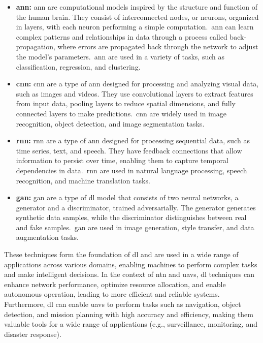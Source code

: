 \begin{itemize}
  \item \textbf{\gls{ann}:} \gls{ann} are computational models inspired by the structure and function of the human brain. They consist of interconnected nodes, or neurons, organized in layers, with each neuron performing a simple computation.\ \gls{ann} can learn complex patterns and relationships in data through a process called back-propagation, where errors are propagated back through the network to adjust the model's parameters.\ \gls{ann} are used in a variety of tasks, such as classification, regression, and clustering.

  \item \textbf{\gls{cnn}:} \gls{cnn} are a type of \gls{ann} designed for processing and analyzing visual data, such as images and videos. They use convolutional layers to extract features from input data, pooling layers to reduce spatial dimensions, and fully connected layers to make predictions.\ \gls{cnn} are widely used in image recognition, object detection, and image segmentation tasks.

  \item \textbf{\gls{rnn}:} \gls{rnn} are a type of \gls{ann} designed for processing sequential data, such as time series, text, and speech. They have feedback connections that allow information to persist over time, enabling them to capture temporal dependencies in data.\ \gls{rnn} are used in natural language processing, speech recognition, and machine translation tasks.

  \item \textbf{\gls{gan}:} \gls{gan} are a type of \gls{dl} model that consists of two neural networks, a generator and a discriminator, trained adversarially. The generator generates synthetic data samples, while the discriminator distinguishes between real and fake samples.\ \gls{gan} are used in image generation, style transfer, and data augmentation tasks.
\end{itemize}

These techniques form the foundation of \gls{dl} and are used in a wide range of applications across various domains, enabling machines to perform complex tasks and make intelligent decisions. In the context of \gls{ntn} and \glspl{uav}, \gls{dl} techniques can enhance network performance, optimize resource allocation, and enable autonomous operation, leading to more efficient and reliable systems. Furthermore, \gls{dl} can enable \glspl{uav} to perform tasks such as navigation, object detection, and mission planning with high accuracy and efficiency, making them valuable tools for a wide range of applications (e.g., surveillance, monitoring, and disaster response).

